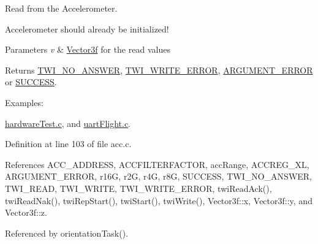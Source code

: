 Read from the Accelerometer. 

Accelerometer should already be initialized! 
\begin{DoxyParams}{Parameters}
{\em v} & \hyperlink{struct_vector3f}{Vector3f} for the read values \\
\hline
\end{DoxyParams}
\begin{DoxyReturn}{Returns}
\hyperlink{group__error_gga2c3e4bb40f36b262a5214e2da2bca9c5a04d5943ba652af2205c88b247e0c659c}{T\-W\-I\-\_\-\-N\-O\-\_\-\-A\-N\-S\-W\-E\-R}, \hyperlink{group__error_gga2c3e4bb40f36b262a5214e2da2bca9c5ac0e3b3463dcaf220e54794b4711708c9}{T\-W\-I\-\_\-\-W\-R\-I\-T\-E\-\_\-\-E\-R\-R\-O\-R}, \hyperlink{group__error_gga2c3e4bb40f36b262a5214e2da2bca9c5a49ccf277a69dd938c591928aa27c66cc}{A\-R\-G\-U\-M\-E\-N\-T\-\_\-\-E\-R\-R\-O\-R} or \hyperlink{group__error_gga2c3e4bb40f36b262a5214e2da2bca9c5ac7f69f7c9e5aea9b8f54cf02870e2bf8}{S\-U\-C\-C\-E\-S\-S}. 
\end{DoxyReturn}
\begin{Desc}
\item[Examples\-: ]\par
\hyperlink{hardware_test_8c-example}{hardware\-Test.\-c}, and \hyperlink{uart_flight_8c-example}{uart\-Flight.\-c}.\end{Desc}


Definition at line 103 of file acc.\-c.



References A\-C\-C\-\_\-\-A\-D\-D\-R\-E\-S\-S, A\-C\-C\-F\-I\-L\-T\-E\-R\-F\-A\-C\-T\-O\-R, acc\-Range, A\-C\-C\-R\-E\-G\-\_\-\-X\-L, A\-R\-G\-U\-M\-E\-N\-T\-\_\-\-E\-R\-R\-O\-R, r16\-G, r2\-G, r4\-G, r8\-G, S\-U\-C\-C\-E\-S\-S, T\-W\-I\-\_\-\-N\-O\-\_\-\-A\-N\-S\-W\-E\-R, T\-W\-I\-\_\-\-R\-E\-A\-D, T\-W\-I\-\_\-\-W\-R\-I\-T\-E, T\-W\-I\-\_\-\-W\-R\-I\-T\-E\-\_\-\-E\-R\-R\-O\-R, twi\-Read\-Ack(), twi\-Read\-Nak(), twi\-Rep\-Start(), twi\-Start(), twi\-Write(), Vector3f\-::x, Vector3f\-::y, and Vector3f\-::z.



Referenced by orientation\-Task().


